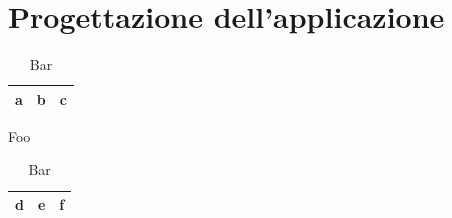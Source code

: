 \documentclass[a4paper,12pt]{report}
\begin{document}
	\chapter{Progettazione dell'applicazione}
		\begin{table}
			\parbox{.45\linewidth}{
				\centering
				\begin{tabular}{|c|c|c|}
					\hline
					a&b&c\\
					\hline
				\end{tabular}
				\caption{Foo}
			}
			\hfill
			\parbox{.45\linewidth}{
				\centering
				\begin{tabular}{ccc}
					\hline
					d&e&f\\
					\hline
				\end{tabular}
				\caption{Bar}
			}
		\end{table}
\end{document}
